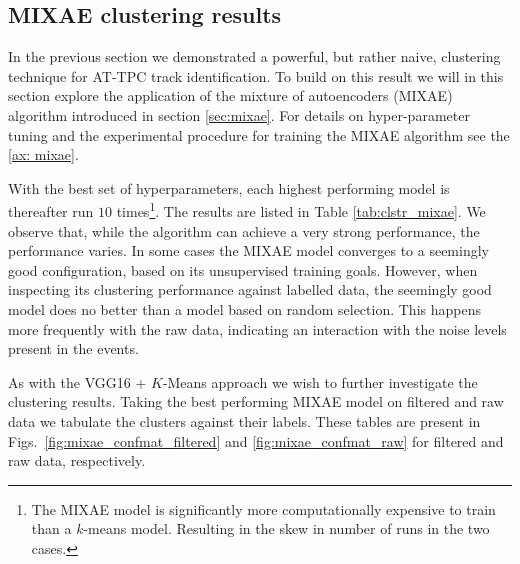 \documentclass[preprint,12pt]{elsarticle}
\begin{document}
\subsection{MIXAE clustering results}

In the previous section we demonstrated a powerful, but rather naive, clustering technique for AT-TPC track identification. To build on this result we will in this section explore the application of the mixture of autoencoders (MIXAE) algorithm introduced in section \ref{sec:mixae}.
For details on hyper-parameter tuning and the experimental procedure for training the MIXAE algorithm see the \ref{ax: mixae}. 

With the best set of hyperparameters, each highest performing model is thereafter run $10$ times\footnote{The MIXAE model is significantly more computationally expensive to train than a $k$-means model. Resulting in the skew in number of runs in the two cases.}. The results are listed in Table \ref{tab:clstr_mixae}.
We observe that, while the algorithm can achieve a very strong performance, the performance varies. In some cases the MIXAE model converges to a seemingly good configuration, based on its unsupervised training goals. However, when inspecting its clustering performance against labelled data, the seemingly good model does no better than a model based on random selection. 
This happens more frequently with the raw data, indicating an interaction with the noise levels present in the events. 
 
\begin{table}[H]
\centering 
\caption[MIXAE clustering performance]{MIXAE clustering performance on the ${}^{46} Ar$ experimental data with $N=10$ runs of the algorithm. To quantify the results we report the best performing model (Top 1), and the mean and standard deviation for the result ($\mu\pm \sigma$). In contrast with the VGG-16 + $k$-means approach we observe  significant variations in performance.}\label{tab:clstr_mixae}

\end{table}

As with the VGG16 + $K$-Means approach we wish to further investigate the clustering results. Taking the best performing MIXAE model on filtered and raw data we tabulate the clusters against their labels. These tables are present in Figs.~\ref{fig:mixae_confmat_filtered} and \ref{fig:mixae_confmat_raw} for filtered and raw data, respectively.
\end{document}

